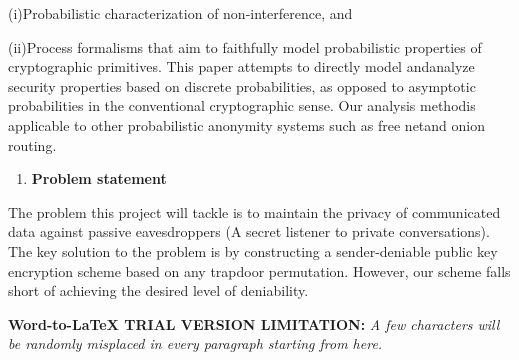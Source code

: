 \documentclass[10pt]{article}
\begin{document}
{\raggedright
(i){\large  }Probabilistic characterization of non-interference, and
}

{\raggedright
(ii){\large  }Process formalisms that aim to faithfully model probabilistic
properties of cryptographic primitives. This paper attempts to directly model
and{\large  }analyze security properties based on discrete probabilities, as
opposed to asymptotic probabilities in the conventional cryptographic sense. Our
analysis method{\large  }is applicable to other probabilistic anonymity systems
such as free net{\large  }and onion routing.
}

\begin{enumerate}
	\item \textbf{{\large Problem statement}}
\end{enumerate}

{\raggedright
{\large The problem this project will tackle is to maintain the privacy of
communicated data against passive eavesdroppers (A secret listener to private
conversations). The key solution to the problem is by constructing a
sender-deniable public key encryption scheme based on any trapdoor permutation.
However, our scheme falls short of achieving the desired level of deniability. }
}
{\large  }
\textbf{Word-to-LaTeX TRIAL VERSION LIMITATION:}\textit{ A few characters will be randomly misplaced in every paragraph starting from here.}
\end{document}
